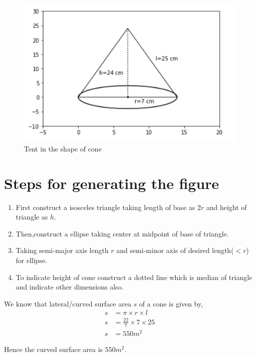 \documentclass[article,12pt,twocolumn]{IEEEtran}
\begin{document}
  \begin{figure}[h!]
	  \centering 
	  \includegraphics[width=\columnwidth]{./Figs/cone.png}
	  \caption{Tent in the shape of cone}
	  \label{Fig1}
  \end{figure}
  
  \section*{Steps for generating the figure}
   \begin{enumerate}
     \item First construct a isosceles triangle taking length of base as $2r$ and height of triangle as $h$.
     \item Then,construct a ellipse taking center at midpoint of base of triangle.
     \item Taking semi-major axis length $r$ and semi-minor axis of desired length($<r$) for ellipse.
     \item To indicate height of cone construct a dotted line which is median of triangle and indicate other dimensions also.
   \end{enumerate} 
  
  We know that lateral/curved surface area $s$ of a cone is given
  by,
  \begin{align}
     s &= \pi \times r \times l 
     \\
     s &= \frac{22}{7} \times 7 \times 25  
     \\
     s &= 550 m^2 
  \end{align}
   
  Hence the curved surface area is $ 550 m^2 $. \\\\
 
\end{document}
